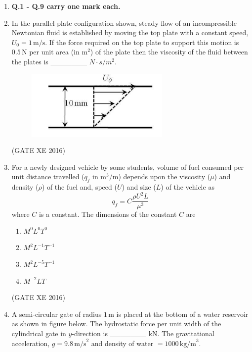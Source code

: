 \documentclass[12pt]{article}
\begin{document}
\begin{enumerate}
\item[] \textbf{Q.1 - Q.9 carry one mark each.}

\item In the parallel-plate configuration shown, steady-flow of an incompressible Newtonian fluid is established by moving the top plate with a constant speed, $U_0 = 1 \,\text{m/s}$. If the force required on the top plate to support this motion is $0.5 \,\text{N}$ per unit area (in $\text{m}^2$) of the plate then the viscosity of the fluid between the plates is \_\_\_\_\_\_\_ $N\cdot s/m^2$.

\begin{figure}[H]
    \centering
    \includegraphics[width=0.5\columnwidth]{figs/ass3_b_q1.png}
    \caption{}
    \label{fig:placeholder}
\end{figure}
(GATE XE 2016)

\item For a newly designed vehicle by some students, volume of fuel consumed per unit distance travelled ($q_f$ in m$^3$/m) depends upon the viscosity ($\mu$) and density ($\rho$) of the fuel and, speed ($U$) and size ($L$) of the vehicle as
$$
q_f = C \frac{\rho U^2 L}{\mu^3}
$$
where $C$ is a constant. The dimensions of the constant $C$ are
\begin{multicols}{4}
\begin{enumerate}
\item $M^0 L^0 T^0$
\item $M^2 L^{-1} T^{-1}$
\item $M^2 L^{-5} T^{-1}$
\item $M^{-2} L T$
\end{enumerate}
\end{multicols}
(GATE XE 2016)

\item A semi-circular gate of radius $1\,\text{m}$ is placed at the bottom of a water reservoir as shown in figure below. The hydrostatic force per unit width of the cylindrical gate in $y$-direction is \_\_\_\_\_\_\_ kN. The gravitational acceleration, $g = 9.8\,\text{m/s}^2$ and density of water $= 1000\,\text{kg/m}^3$.


\end{enumerate}
\end{document}
